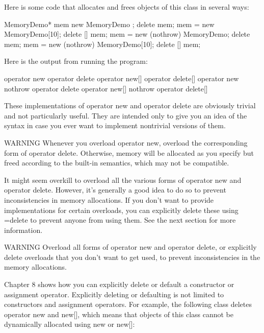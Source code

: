 Here is some code that allocates and frees objects of this class in several ways:

\begin{cpp}
MemoryDemo* mem { new MemoryDemo{} };
delete mem;
mem = new MemoryDemo[10];
delete [] mem;
mem = new (nothrow) MemoryDemo{};
delete mem;
mem = new (nothrow) MemoryDemo[10];
delete [] mem;
\end{cpp}

Here is the output from running the program:

\begin{shell}
operator new
operator delete
operator new[]
operator delete[]
operator new nothrow
operator delete
operator new[] nothrow
operator delete[]
\end{shell}

These implementations of operator new and operator delete are obviously trivial and not particularly useful. They are intended only to give you an idea of the syntax in case you ever want to implement nontrivial versions of them.

\begin{myWarning}{WARNING}
Whenever you overload operator new, overload the corresponding form of operator delete. Otherwise, memory will be allocated as you specify but freed according to the built-in semantics, which may not be compatible.
\end{myWarning}

It might seem overkill to overload all the various forms of operator new and operator delete. However, it’s generally a good idea to do so to prevent inconsistencies in memory allocations. If you don’t want to provide implementations for certain overloads, you can explicitly delete these using =delete to prevent anyone from using them. See the next section for more information.

\begin{myWarning}{WARNING}
Overload all forms of operator new and operator delete, or explicitly delete overloads that you don’t want to get used, to prevent inconsistencies in the memory allocations.
\end{myWarning}


Chapter 8 shows how you can explicitly delete or default a constructor or assignment operator. Explicitly deleting or defaulting is not limited to constructors and assignment operators. For example, the following class deletes operator new and new[], which means that objects of this class cannot be dynamically allocated using new or new[]:

